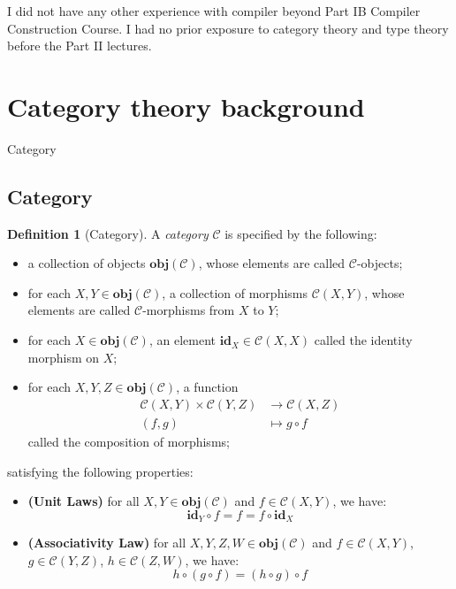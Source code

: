 \documentclass[12pt,twoside,a4paper]{report}
\theoremstyle{definition}
\newtheorem*{definition*}{Definition}
\begin{document}
    I did not have any other experience with compiler beyond Part IB Compiler Construction Course. I had no prior exposure to category theory and type theory before the Part II lectures.

    \section{Category theory background}
        Category 
        \subsection{Category}
        \begin{definition*}[Category]
            A \emph{category} $\mathcal{C}$ is specified by the following:
            \begin{itemize}
                \item 
                    a collection of objects $\textbf{obj}(\mathcal{C})$, whose elements are called $\mathcal{C}$-objects;
                \item 
                    for each $X, Y \in \textbf{obj}(\mathcal{C})$, a collection of morphisms $\mathcal{C}{(X,Y)}$, whose elements are called $\mathcal{C}$-morphisms from $X$ to $Y$;
                \item 
                    for each $X \in \textbf{obj}(\mathcal{C})$, an element $\textbf{id}_X \in \mathcal{C}{(X,X)}$ called the identity morphism on $X$;
                \item 
                    for each $X, Y, Z \in \textbf{obj}(\mathcal{C})$, a function 
                    \[\begin{aligned}
                        \mathcal{C}{(X,Y)} \times \mathcal{C}{(Y,Z)} &\to \mathcal{C}{(X,Z)} \\
                        (f,g) &\mapsto g \circ f
                    \end{aligned}\]
                    called the composition of morphisms;
            \end{itemize}
            satisfying the following properties:
            \begin{itemize}
                \item 
                    \textbf{(Unit Laws)}
                    for all $X, Y \in \textbf{obj}(\mathcal{C})$ and $f \in \mathcal{C}{(X,Y)}$, we have:
                    \begin{equation} \label{law: unit}
                        \textbf{id}_Y \circ f = f = f \circ \textbf{id}_X
                    \end{equation}
                \item
                    \textbf{(Associativity Law)}
                    for all $X, Y, Z, W \in \textbf{obj}(\mathcal{C})$ and $f \in \mathcal{C}{(X,Y)}$, $g \in \mathcal{C}{(Y,Z)}$, $h \in \mathcal{C}{(Z,W)}$, we have:
                    \begin{equation} \label{law: associativity}
                        h \circ (g \circ f) = (h \circ g) \circ f
                    \end{equation}
            \end{itemize}


\end{definition*}
\end{document}
